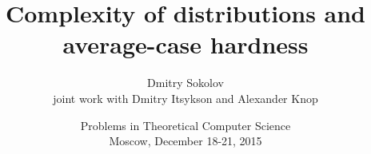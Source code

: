 

\title[Complexity of distributions and average-case hardness]{
	Complexity of distributions and average-case hardness
}
  
\author[Sokolov D.]{Dmitry Sokolov\\ joint work with Dmitry Itsykson and Alexander Knop}

\date{Problems in Theoretical Computer Science\\
	Moscow, December 18-21, 2015}



	\maketitle

	
    
    



